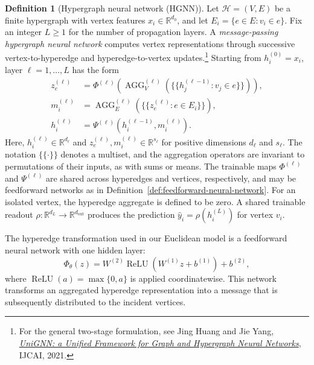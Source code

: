 \documentclass{article}
\theoremstyle{definition}
\newtheorem{definition}{Definition}
\theoremstyle{plain}
\begin{document}
\begin{definition}[Hypergraph neural network (HGNN)]
\label{def:hgnn}
Let $\mathcal{H}=(V,E)$ be a finite hypergraph with vertex features
$x_i\in\mathbb{R}^{d_0}$, and let $E_i=\{e\in E:v_i\in e\}$.
Fix an integer $L\geq1$ for the number of propagation layers.
A \emph{message-passing hypergraph neural network} computes vertex
representations through successive vertex-to-hyperedge and
hyperedge-to-vertex updates.\footnote{For the general two-stage
formulation, see Jing Huang and Jie Yang,
\href{https://www.ijcai.org/proceedings/2021/0353.pdf}{\emph{UniGNN:
a Unified Framework for Graph and Hypergraph Neural Networks}},
IJCAI, 2021.}
Starting from $h_i^{(0)}=x_i$, layer $\ell=1,\ldots,L$ has the form
\begin{align*}
  z_e^{(\ell)}
    &= \Phi^{(\ell)}\!\left(
       \operatorname{AGG}_{V}^{(\ell)}\!\left(
       \{\!\{h_j^{(\ell-1)}:v_j\in e\}\!\}\right)\right),\\
  m_i^{(\ell)}
    &= \operatorname{AGG}_{E}^{(\ell)}\!\left(
       \{\!\{z_e^{(\ell)}:e\in E_i\}\!\}\right),\\
  h_i^{(\ell)}
    &= \Psi^{(\ell)}\!\left(h_i^{(\ell-1)},m_i^{(\ell)}\right).
\end{align*}
Here, $h_i^{(\ell)}\in\mathbb{R}^{d_\ell}$ and
$z_e^{(\ell)},m_i^{(\ell)}\in\mathbb{R}^{s_\ell}$ for positive dimensions
$d_\ell$ and $s_\ell$. The notation $\{\!\{\cdot\}\!\}$ denotes a multiset,
and the aggregation
operators are invariant to permutations of their inputs, as with sums
or means. The trainable maps $\Phi^{(\ell)}$ and $\Psi^{(\ell)}$ are
shared across hyperedges and vertices, respectively, and may be
feedforward networks as in Definition~\ref{def:feedforward-neural-network}.
For an isolated vertex, the hyperedge aggregate is defined to be zero.
A shared trainable readout $\rho:\mathbb{R}^{d_L}\to\mathbb{R}^{d_{\mathrm{out}}}$
produces the prediction $\widehat y_i=\rho(h_i^{(L)})$ for vertex $v_i$.
\end{definition}

The hyperedge transformation used in our Euclidean model is a
feedforward neural network with one hidden layer:
\[
  \Phi_\theta(z)
  =
  W^{(2)}
  \operatorname{ReLU}\!\left(
    W^{(1)}z+b^{(1)}
  \right)
  +b^{(2)},
\]
where $\operatorname{ReLU}(a)=\max\{0,a\}$ is applied
coordinatewise. This network transforms an aggregated
hyperedge representation into a message that is subsequently
distributed to the incident vertices.
\end{document}
